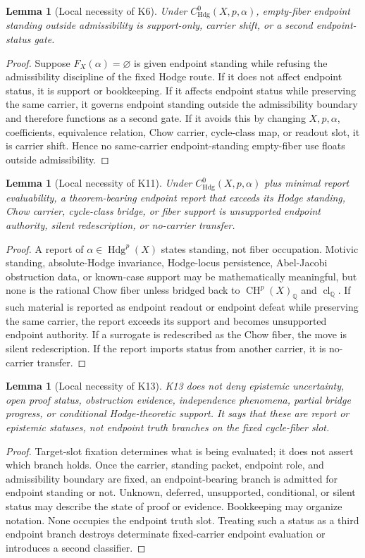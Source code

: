 \documentclass[11pt]{article}
\newtheorem{lemma}[theorem]{Lemma}
\newcommand{\QQ}{\mathbb{Q}}
\newcommand{\CH}{\operatorname{CH}}
\newcommand{\Hdg}{\operatorname{Hdg}}
\newcommand{\clQ}{\operatorname{cl}_{\QQ}}
\begin{document}
\begin{lemma}[Local necessity of K6]
Under $C^0_{\Hdg}(X,p,\alpha)$, empty-fiber endpoint standing outside admissibility is support-only, carrier shift, or a second endpoint-status gate.
\end{lemma}
\begin{proof}
Suppose $F_X(\alpha)=\varnothing$ is given endpoint standing while refusing the admissibility discipline of the fixed Hodge route.  If it does not affect endpoint status, it is support or bookkeeping.  If it affects endpoint status while preserving the same carrier, it governs endpoint standing outside the admissibility boundary and therefore functions as a second gate.  If it avoids this by changing $X,p,\alpha$, coefficients, equivalence relation, Chow carrier, cycle-class map, or readout slot, it is carrier shift.  Hence no same-carrier endpoint-standing empty-fiber use floats outside admissibility.
\end{proof}

\begin{lemma}[Local necessity of K11]
Under $C^0_{\Hdg}(X,p,\alpha)$ plus minimal report evaluability, a theorem-bearing endpoint report that exceeds its Hodge standing, Chow carrier, cycle-class bridge, or fiber support is unsupported endpoint authority, silent redescription, or no-carrier transfer.
\end{lemma}
\begin{proof}
A report of $\alpha\in\Hdg^p(X)$ states standing, not fiber occupation.  Motivic standing, absolute-Hodge invariance, Hodge-locus persistence, Abel-Jacobi obstruction data, or known-case support may be mathematically meaningful, but none is the rational Chow fiber unless bridged back to $\CH^p(X)_\QQ$ and $\clQ$.  If such material is reported as endpoint readout or endpoint defeat while preserving the same carrier, the report exceeds its support and becomes unsupported endpoint authority.  If a surrogate is redescribed as the Chow fiber, the move is silent redescription.  If the report imports status from another carrier, it is no-carrier transfer.
\end{proof}

\begin{lemma}[Local necessity of K13]
K13 does not deny epistemic uncertainty, open proof status, obstruction evidence, independence phenomena, partial bridge progress, or conditional Hodge-theoretic support.  It says that these are report or epistemic statuses, not endpoint truth branches on the fixed cycle-fiber slot.
\end{lemma}
\begin{proof}
Target-slot fixation determines what is being evaluated; it does not assert which branch holds.  Once the carrier, standing packet, endpoint role, and admissibility boundary are fixed, an endpoint-bearing branch is admitted for endpoint standing or not.  Unknown, deferred, unsupported, conditional, or silent status may describe the state of proof or evidence.  Bookkeeping may organize notation.  None occupies the endpoint truth slot.  Treating such a status as a third endpoint branch destroys determinate fixed-carrier endpoint evaluation or introduces a second classifier.
\end{proof}
\end{document}
